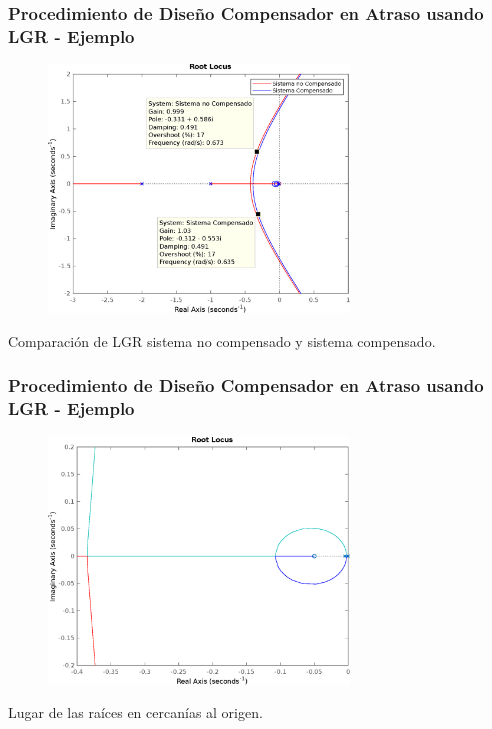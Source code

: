 \documentclass[aspectratio=169,handout]{beamer}
\theoremstyle{definition}
\theoremstyle{plain}
\theoremstyle{remark}
\begin{document}
\begin{frame}[c]\frametitle{Procedimiento de Diseño Compensador en Atraso usando LGR - Ejemplo}
	\begin{figure}
		\centering
		\includegraphics[width=8cm]{images/ejemplo2_LGRcompensado.eps}
	\end{figure}
	\vspace*{-5mm}
	\centering \small Comparación de LGR sistema no compensado y sistema compensado.
\end{frame}

\begin{frame}[c]\frametitle{Procedimiento de Diseño Compensador en Atraso usando LGR - Ejemplo}
	\begin{figure}
		\centering
		\includegraphics[width=8cm]{images/ejemplo2_LGR_origen.eps}
	\end{figure}
	\vspace*{-5mm}
	\centering \small Lugar de las raíces en cercanías al origen.
\end{frame}
\end{document}
